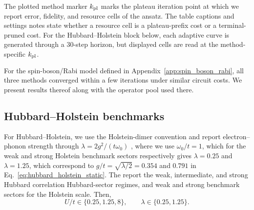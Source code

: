 \documentclass[
  reprint,
  amsmath,
  amssymb,
  aps,
  pra,
  nofootinbib,
  superscriptaddress,
  floatfix
]{revtex4-2}
\begin{document}
The plotted method marker \(k_{\rm pl}\) marks the plateau iteration point at which we report error, fidelity, and resource cells of the ansatz. The table captions and settings notes state whether a resource cell is a plateau-prefix cost or a terminal-pruned cost. For the Hubbard--Holstein block below, each adaptive curve is generated through a 30-step horizon, but displayed cells are read at the method-specific \(k_{\rm pl}\).

For the spin-boson/Rabi model defined in Appendix~\ref{app:spin_boson_rabi}, all three methods converged within a few iterations under similar circuit costs. We present results thereof along with the operator pool used there.

\subsection{Hubbard--Holstein benchmarks}

For Hubbard--Holstein, we use the Holstein-dimer convention and report electron--phonon strength through \(\lambda=2g^2/(t\omega_0)\) \cite{Sakkinen2015HolsteinDimer}, where  we use
\(\omega_0/t=1\), which for the weak and strong Holstein benchmark sectors respectively gives
\(\lambda=0.25\) and \(\lambda=1.25\), which correspond to
\(g/t=\sqrt{\lambda/2}=0.354\) and \(0.791\) in Eq.~\eqref{eq:hubbard_holstein_static}. 
The report the weak, intermediate, and strong Hubbard correlation Hubbard-sector regimes, and weak and strong benchmark sectors for the Holstein scale. Then,
\[
U/t\in\{0.25,1.25,8\},\qquad \lambda\in\{0.25,1.25\}.
\]
\end{document}
